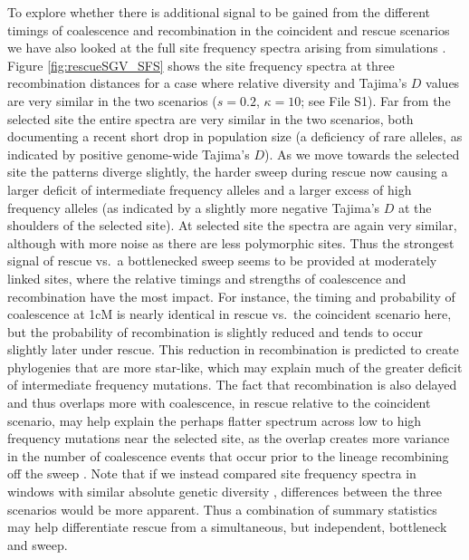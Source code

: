 \documentclass[]{article}
\begin{document}
To explore whether there is additional signal to be gained from the different timings of coalescence and recombination in the coincident and rescue scenarios we have also looked at the full site frequency spectra arising from simulations \citep[of which pairwise diversity and Tajima's $D$ are summaries;][p.\ 116]{wakeley2009coalescent}.
Figure \ref{fig:rescueSGV_SFS} shows the site frequency spectra at three recombination distances for a case where relative diversity and Tajima's $D$ values are very similar in the two scenarios ($s=0.2$, $\kappa=10$; see File S1).
Far from the selected site the entire spectra are very similar in the two scenarios, both documenting a recent short drop in population size (a deficiency of rare alleles, as indicated by positive genome-wide Tajima's $D$).
As we move towards the selected site the patterns diverge slightly, the harder sweep during rescue now causing a larger deficit of intermediate frequency alleles and a larger excess of high frequency alleles (as indicated by a slightly more negative Tajima's $D$ at the shoulders of the selected site).
At selected site the spectra are again very similar, although with more noise as there are less polymorphic sites.
Thus the strongest signal of rescue vs.\ a bottlenecked sweep seems to be provided at moderately linked sites, where the relative timings and strengths of coalescence and recombination have the most impact.
For instance, the timing and probability of coalescence at 1cM is nearly identical in rescue vs.\ the coincident scenario here, but the probability of recombination is slightly reduced and tends to occur slightly later under rescue. 
This reduction in recombination is predicted to create phylogenies that are more star-like, which may explain much of the greater deficit of intermediate frequency mutations.
The fact that recombination is also delayed and thus overlaps more with coalescence, in rescue relative to the coincident scenario, may help explain the perhaps flatter spectrum across low to high frequency mutations near the selected site, as the overlap creates more variance in the number of coalescence events that occur prior to the lineage recombining off the sweep \citep[similar to the effect of recurrent mutation;][]{pennings2006soft}.
Note that if we instead compared site frequency spectra in windows with similar absolute genetic diversity \citep[as in figure 6 of][]{kim2010signatures}, differences between the three scenarios would be more apparent.
Thus a combination of summary statistics may help differentiate rescue from a simultaneous, but independent, bottleneck and sweep.
\end{document}

